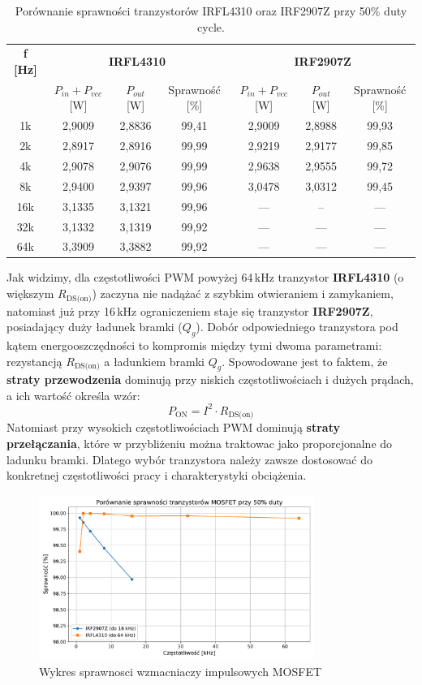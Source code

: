 \documentclass[11pt]{article}
\begin{document}
\begin{table}[H]
\centering
\begin{tabular}{|c|c|c|c|c|c|c|}
\hline
\textbf{f [Hz]} & \multicolumn{3}{c|}{\textbf{IRFL4310}} & \multicolumn{3}{c|}{\textbf{IRF2907Z}} \\
\cline{2-7}
 & $P_{in}+P_{vcc}$ [W] & $P_{out}$ [W] & Sprawność [\%] & $P_{in}+P_{vcc}$ [W] & $P_{out}$ [W] & Sprawność [\%] \\
\hline
1k   & 2,9009 & 2,8836 & 99,41 & 2,9009 & 2,8988 & 99,93 \\
\hline
2k   & 2,8917 & 2,8916 & 99,99 & 2,9219 & 2,9177 & 99,85 \\
\hline
4k   & 2,9078 & 2,9076 & 99,99 & 2,9638 & 2,9555 & 99,72 \\
\hline
8k   & 2,9400 & 2,9397 & 99,96 & 3,0478 & 3,0312 & 99,45 \\
\hline
16k  & 3,1335 & 3,1321 & 99,96 & --- & -- & --- \\
\hline
32k  & 3,1332 & 3,1319 & 99,92 & --- & --- & --- \\
\hline
64k  & 3,3909 & 3,3882 & 99,92 & --- & --- & --- \\
\hline
\end{tabular}
\caption{Porównanie sprawności tranzystorów IRFL4310 oraz IRF2907Z przy 50\% duty cycle.}
\end{table}

Jak widzimy, dla częstotliwości PWM powyżej 64\,kHz tranzystor \textbf{IRFL4310} (o większym $R_{\text{DS(on)}}$) zaczyna nie nadążać z szybkim otwieraniem i zamykaniem, natomiast już przy 16\,kHz ograniczeniem staje się tranzystor \textbf{IRF2907Z}, posiadający duży ładunek bramki ($Q_g$).
Dobór odpowiedniego tranzystora pod kątem energooszczędności to kompromis między tymi dwoma parametrami: rezystancją $R_{\text{DS(on)}}$ a ładunkiem bramki $Q_g$.
Spowodowane jest to faktem, że \textbf{straty przewodzenia} dominują przy niskich częstotliwościach i dużych prądach, a ich wartość określa wzór:
\[
P_{\text{ON}} = I^2 \cdot R_{\text{DS(on)}}
\]
Natomiast przy wysokich częstotliwościach PWM dominują \textbf{straty przełączania}, które w przybliżeniu można traktowac jako proporcjonalne do ladunku bramki.
Dlatego wybór tranzystora należy zawsze dostosować do konkretnej częstotliwości pracy i charakterystyki obciążenia.\\

\begin{figure}[H]
\centering
\includegraphics[width=0.8\textwidth]{aun1_imp_mosfet_comparison.pdf}
\caption{Wykres sprawnosci wzmacniaczy impulsowych MOSFET}
\end{figure}
\end{document}
